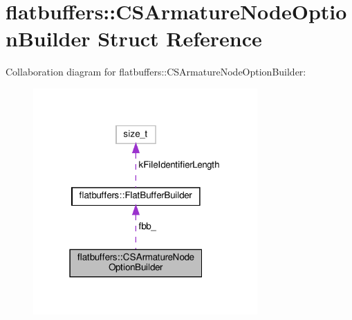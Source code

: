 \hypertarget{structflatbuffers_1_1CSArmatureNodeOptionBuilder}{}\section{flatbuffers\+:\+:C\+S\+Armature\+Node\+Option\+Builder Struct Reference}
\label{structflatbuffers_1_1CSArmatureNodeOptionBuilder}


Collaboration diagram for flatbuffers\+:\+:C\+S\+Armature\+Node\+Option\+Builder\+:
\nopagebreak
\begin{figure}[H]
\begin{center}
\leavevmode
\includegraphics[width=243pt]{structflatbuffers_1_1CSArmatureNodeOptionBuilder__coll__graph}
\end{center}
\end{figure}
